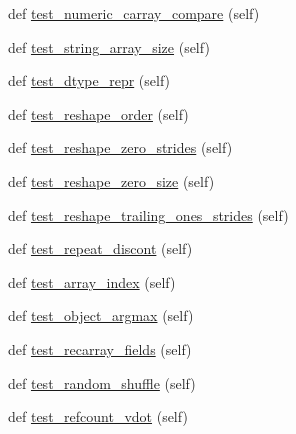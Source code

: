\begin{DoxyCompactItemize}
\item 
def \hyperlink{classnumpy_1_1core_1_1tests_1_1test__regression_1_1TestRegression_ab4c23362906944fd8788fe84269df745}{test\+\_\+numeric\+\_\+carray\+\_\+compare} (self)
\item 
def \hyperlink{classnumpy_1_1core_1_1tests_1_1test__regression_1_1TestRegression_ae684bc9131bb6f324fdd8ed89c20fd88}{test\+\_\+string\+\_\+array\+\_\+size} (self)
\item 
def \hyperlink{classnumpy_1_1core_1_1tests_1_1test__regression_1_1TestRegression_a42cee19adbae0128c08a3ae63f47b18d}{test\+\_\+dtype\+\_\+repr} (self)
\item 
def \hyperlink{classnumpy_1_1core_1_1tests_1_1test__regression_1_1TestRegression_a4ae8f3563acfc0a1cf4ccbac7eb16c3c}{test\+\_\+reshape\+\_\+order} (self)
\item 
def \hyperlink{classnumpy_1_1core_1_1tests_1_1test__regression_1_1TestRegression_aba7727957883dd826afccaa2e6e03fef}{test\+\_\+reshape\+\_\+zero\+\_\+strides} (self)
\item 
def \hyperlink{classnumpy_1_1core_1_1tests_1_1test__regression_1_1TestRegression_a9ab00fa816b116a2298c26ef1fc3c0ec}{test\+\_\+reshape\+\_\+zero\+\_\+size} (self)
\item 
def \hyperlink{classnumpy_1_1core_1_1tests_1_1test__regression_1_1TestRegression_abd99eac511d338c7258353f3c169b2da}{test\+\_\+reshape\+\_\+trailing\+\_\+ones\+\_\+strides} (self)
\item 
def \hyperlink{classnumpy_1_1core_1_1tests_1_1test__regression_1_1TestRegression_ac82c3cd908745521a9b364c28d918f28}{test\+\_\+repeat\+\_\+discont} (self)
\item 
def \hyperlink{classnumpy_1_1core_1_1tests_1_1test__regression_1_1TestRegression_aa7f454bd55dfc4e659a3196bc99bf89a}{test\+\_\+array\+\_\+index} (self)
\item 
def \hyperlink{classnumpy_1_1core_1_1tests_1_1test__regression_1_1TestRegression_a7c031908867d1ff70ab1ad66e06c9c24}{test\+\_\+object\+\_\+argmax} (self)
\item 
def \hyperlink{classnumpy_1_1core_1_1tests_1_1test__regression_1_1TestRegression_acaa141b046bd3077df8e3a390cf5c343}{test\+\_\+recarray\+\_\+fields} (self)
\item 
def \hyperlink{classnumpy_1_1core_1_1tests_1_1test__regression_1_1TestRegression_a48903f0afa61595f5ab1de8038c3fe5e}{test\+\_\+random\+\_\+shuffle} (self)
\item 
def \hyperlink{classnumpy_1_1core_1_1tests_1_1test__regression_1_1TestRegression_a9c6d97dd6974fd19a095077ac55747b3}{test\+\_\+refcount\+\_\+vdot} (self)

\end{DoxyCompactItemize}
